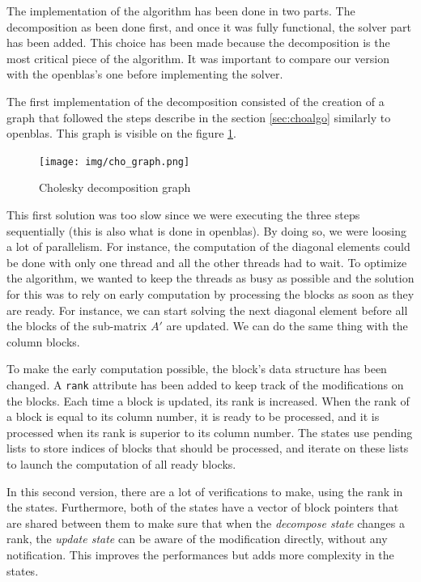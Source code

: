 The implementation of the algorithm has been done in two parts. The
decomposition as been done first, and once it was fully functional, the solver
part has been added. This choice has been made because the decomposition is the
most critical piece of the algorithm. It was important to compare our version
with the openblas's one before implementing the solver.

The first implementation of the decomposition consisted of the creation of a
graph that followed the steps describe in the section \ref{sec:choalgo}
similarly to openblas. This graph is visible on the figure \ref{fig:chograph}.

\begin{figure}[h!]
  \begin{center}
    \texttt{[image: img/cho\_graph.png]}
    \caption{Cholesky decomposition graph}
    \label{fig:chograph}
  \end{center}
\end{figure}


This first solution was too slow since we were executing the three steps
sequentially (this is also what is done in openblas). By doing so, we were
loosing a lot of parallelism. For instance, the computation of the diagonal
elements could be done with only one thread and all the other threads had to
wait. To optimize the algorithm, we wanted to keep the threads as busy as
possible and the solution for this was to rely on early computation by
processing the blocks as soon as they are ready. For instance, we can start
solving the next diagonal element before all the blocks of the sub-matrix $A'$
are updated. We can do the same thing with the column blocks.

To make the early computation possible, the block's data structure has been
changed. A \texttt{rank} attribute has been added to keep track of the
modifications on the blocks. Each time a block is updated, its rank is
increased. When the rank of a block is equal to its column number, it is ready
to be processed, and it is processed when its rank is superior to its column
number. The states use pending lists to store indices of blocks that should be
processed, and iterate on these lists to launch the computation of all ready
blocks.

In this second version, there are a lot of verifications to make, using the rank
in the states. Furthermore, both of the states have a vector of block pointers
that are shared between them to make sure that when the \textit{decompose state}
changes a rank, the \textit{update state} can be aware of the modification
directly, without any notification. This improves the performances but adds more
complexity in the states.

